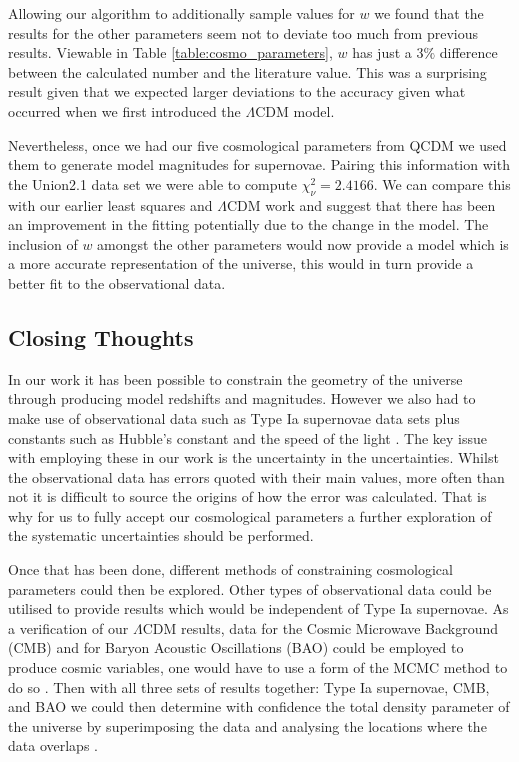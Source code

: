 \documentclass[twocolumn]{revtex4}
\begin{document}
{{{Allowing our algorithm to additionally sample values for $w$ we found that the results for the other parameters seem not to deviate too much from previous results. Viewable in Table \ref{table:cosmo_parameters}, $w$ has just a $3\%$ difference between the calculated number and the literature value. This was a surprising result given that we expected larger deviations to the accuracy given what occurred when we first introduced the $\Lambda$CDM model. 

Nevertheless, once we had our five cosmological parameters from QCDM we used them to generate model magnitudes for supernovae. Pairing this information with the Union2.1 data set we were able to compute $\chi^2_\nu= 2.4166$. We can compare this with our earlier least squares and $\Lambda$CDM work and suggest that there has been an improvement in the fitting potentially due to the change in the model. The inclusion of $w$ amongst the other parameters would now provide a model which is a more accurate representation of the universe, this would in turn provide a better fit to the observational data. 

\vspace{-3ex}
\subsection{Closing Thoughts} 
\vspace{-2ex}
In our work it has been possible to constrain the geometry of the universe through producing model redshifts and magnitudes. However we also had to make use of observational data such as Type Ia supernovae data sets \cite{dataset_1, dataset_2} plus constants such as Hubble's constant \cite{hubble_constant} and the speed of the light \cite{speed_of_light}. The key issue with employing these in our work is the uncertainty in the uncertainties. Whilst the observational data has errors quoted with their main values, more often than not it is difficult to source the origins of how the error was calculated. That is why for us to fully accept our cosmological parameters a further exploration of the systematic uncertainties should be performed.

Once that has been done, different methods of constraining cosmological parameters could then be explored. Other types of observational data could be utilised to provide results which would be independent of Type Ia supernovae. As a verification of our $\Lambda$CDM results, data for the Cosmic Microwave Background (CMB) and for Baryon Acoustic Oscillations (BAO) could be employed to produce cosmic variables, one would have to use a form of the MCMC method to do so \cite{cmb_cosmo, dataset_2}. Then with all three sets of results together: Type Ia supernovae, CMB, and BAO we could then determine with confidence the total density parameter of the universe by superimposing the data and analysing the locations where the data overlaps \cite{dataset_2}.

}}}
\end{document}
